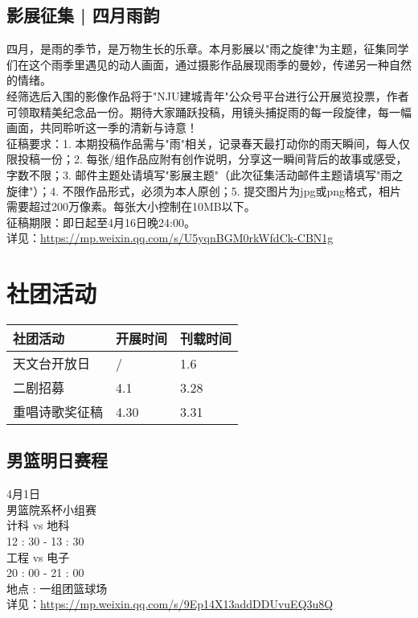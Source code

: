 \documentclass[letterpaper, 12pt]{article}
\begin{document}
\begin{multicols}{2}
\subsection{影展征集 | 四月雨韵}
四月，是雨的季节，是万物生长的乐章。本月影展以"雨之旋律"为主题，征集同学们在这个雨季里遇见的动人画面，通过摄影作品展现雨季的曼妙，传递另一种自然的情绪。
\\经筛选后入围的影像作品将于"NJU建城青年"公众号平台进行公开展览投票，作者可领取精美纪念品一份。期待大家踊跃投稿，用镜头捕捉雨的每一段旋律，每一幅画面，共同聆听这一季的清新与诗意！
\\征稿要求：1. 本期投稿作品需与"雨"相关，记录春天最打动你的雨天瞬间，每人仅限投稿一份；2. 每张/组作品应附有创作说明，分享这一瞬间背后的故事或感受，字数不限；3. 邮件主题处请填写"影展主题"（此次征集活动邮件主题请填写"雨之旋律"）；4. 不限作品形式，必须为本人原创；5. 提交图片为jpg或png格式，相片需要超过200万像素。每张大小控制在10MB以下。
\\征稿期限：即日起至4月16日晚24:00。
\\详见：\url{https://mp.weixin.qq.com/s/U5yqnBGM0rkWfdCk-CBN1g}
\section{社团活动}
\begin{tabular}{|>{\centering\arraybackslash}m{}|m{}|m{}|}
    \hline
    社团活动 & 开展时间 & 刊载时间\\
    \hline\hline
    天文台开放日 & / & 1.6\\
    二剧招募 & 4.1 & 3.28\\
    重唱诗歌奖征稿 & 4.30 & 3.31\\
    \hline
\end{tabular}
\subsection{男篮明日赛程}
4月1日
\\男篮院系杯小组赛
\\计科 vs 地科 
\\12 : 30 - 13 : 30
\\工程 vs 电子 
\\20 : 00 - 21 : 00
\\地点 : 一组团篮球场
\\详见：\url{https://mp.weixin.qq.com/s/9Ep14X13addDDUvuEQ3u8Q}

\end{multicols}
\end{document}
